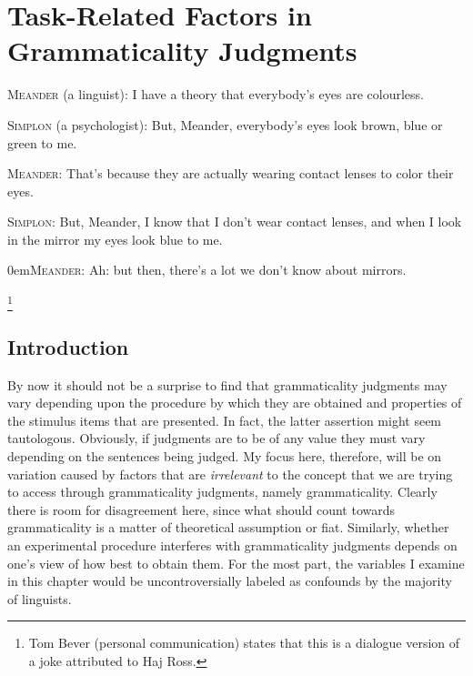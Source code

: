 \chapter{Task-Related Factors in Grammaticality Judgments}\label{sec:5}

\textsc{Meander} (a linguist): I have a theory that everybody's eyes are colourless.

{\leftskip=10pt\parindent -10pt
\textsc{Simplon} (a psychologist):  But, Meander, everybody's eyes look brown, blue or green to me.

\textsc{Meander}: That's because they are actually wearing contact lenses to color
their eyes.

\textsc{Simplon}: But, Meander, I know that I don't wear contact lenses, and when I look in the mirror my eyes look blue to me.

\parindent 0em\textsc{Meander}: Ah: but then, there's a lot we don't know about mirrors.
}\begin{flushright}\citep{Bever1974}\footnote{Tom Bever (personal communication) states that this is a dialogue version of a joke attributed to Haj Ross.}\end{flushright}


\section{Introduction}\label{sec:5.1}

By now it should not be a surprise to find that grammaticality judgments may vary depending upon the procedure by which they are obtained and properties of the stimulus items that are presented. In fact, the latter assertion might seem tautologous. Obviously, if judgments are to be of any value they must vary depending on the sentences being judged. My focus here, therefore, will be on variation caused by factors that are \textit{irrelevant} to the concept that we are trying to access through grammaticality judgments, namely grammaticality. Clearly there is room for disagreement here, since what should count towards grammaticality is a matter of theoretical assumption or fiat. Similarly, whether an experimental procedure interferes with grammaticality judgments depends on one's view of how best to obtain them. For the most part, the variables I examine in this chapter would be uncontroversially labeled as confounds by the majority of linguists.




